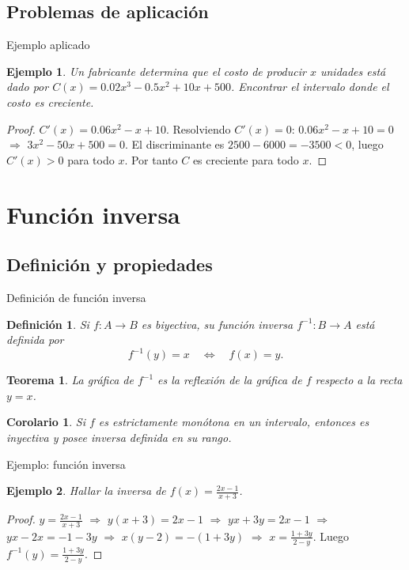 \documentclass[10pt, spanish]{beamer}
\newtheorem{definicion}{Definición}
\newtheorem{teorema}{Teorema}
\newtheorem{corolario}{Corolario}
\newtheorem{ejemplo}{Ejemplo}
\begin{document}
	\subsection{Problemas de aplicación}
	\begin{frame}{Ejemplo aplicado}
		\begin{ejemplo}
			Un fabricante determina que el costo de producir $x$ unidades está dado por $C(x)=0.02x^3-0.5x^2+10x+500$. Encontrar el intervalo donde el costo es creciente.
		\end{ejemplo}
		\begin{proof}
			$C'(x)=0.06x^2-x+10$. Resolviendo $C'(x)=0$: $0.06x^2-x+10=0$ $\Rightarrow$ $3x^2-50x+500=0$. El discriminante es $2500-6000=-3500<0$, luego $C'(x)>0$ para todo $x$. Por tanto $C$ es creciente para todo $x$.
		\end{proof}
	\end{frame}
	
	\section{Función inversa}
	\subsection{Definición y propiedades}
	\begin{frame}{Definición de función inversa}
		\begin{definicion}
			Si $f:A\to B$ es biyectiva, su \textit{función inversa} $f^{-1}:B\to A$ está definida por
			\[
			f^{-1}(y)=x \quad \Longleftrightarrow \quad f(x)=y.
			\]
		\end{definicion}
		\begin{teorema}
			La gráfica de $f^{-1}$ es la reflexión de la gráfica de $f$ respecto a la recta $y=x$.
		\end{teorema}
		\begin{corolario}
			Si $f$ es estrictamente monótona en un intervalo, entonces es inyectiva y posee inversa definida en su rango.
		\end{corolario}
	\end{frame}
	
	\begin{frame}{Ejemplo: función inversa}
		\begin{ejemplo}
			Hallar la inversa de $f(x)=\frac{2x-1}{x+3}$.
		\end{ejemplo}
		\begin{proof}
			$y=\frac{2x-1}{x+3}$ $\Rightarrow$ $y(x+3)=2x-1$ $\Rightarrow$ $yx+3y=2x-1$ $\Rightarrow$ $yx-2x=-1-3y$ $\Rightarrow$ $x(y-2)=-(1+3y)$ $\Rightarrow$ $x=\frac{1+3y}{2-y}$. Luego $f^{-1}(y)=\frac{1+3y}{2-y}$.
		\end{proof}
	\end{frame}
	
\end{document}
